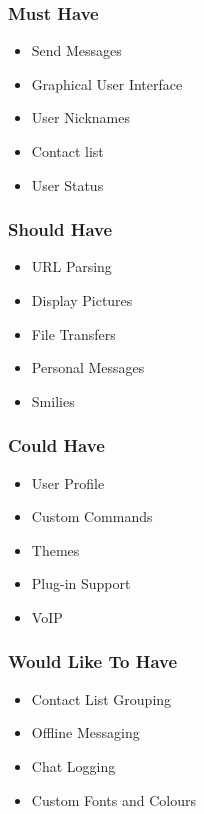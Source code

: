 \subsubsection{Must Have}

\begin{itemize}
\item{Send Messages}
\item{Graphical User Interface}
\item{User Nicknames}
\item{Contact list}
\item{User Status}
\end{itemize}

\subsubsection{Should Have}

\begin{itemize}
\item{URL Parsing}
\item{Display Pictures}
\item{File Transfers}
\item{Personal Messages}
\item{Smilies}
\end{itemize}

\subsubsection{Could Have}

\begin{itemize}
\item{User Profile}
\item{Custom Commands}
\item{Themes}
\item{Plug-in Support}
\item{VoIP}
\end{itemize}

\subsubsection{Would Like To Have}

\begin{itemize}
\item{Contact List Grouping}
\item{Offline Messaging}
\item{Chat Logging}
\item{Custom Fonts and Colours}
\end{itemize}

